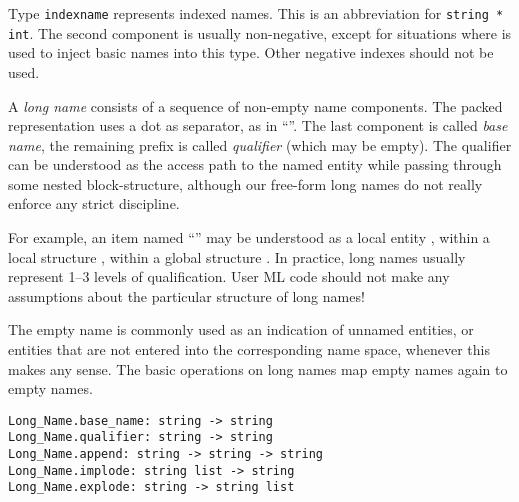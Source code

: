 \begin{isabellebody}
\begin{isamarkuptext}
\begin{description}
  \item Type \verb|indexname| represents indexed names.  This is
  an abbreviation for \verb|string * int|.  The second component
  is usually non-negative, except for situations where  is used to inject basic names into this type.  Other negative
  indexes should not be used.

  \end{description}%
\end{isamarkuptext}%
\isamarkuptrue%
%
\endisatagmlref
{\isafoldmlref}%
%
\isadelimmlref
%
\endisadelimmlref
%
\isamarkuptrue%
%
\begin{isamarkuptext}%
A \emph{long name} consists of a sequence of non-empty name
  components.  The packed representation uses a dot as separator, as
  in ``''.  The last component is called \emph{base
  name}, the remaining prefix is called \emph{qualifier} (which may be
  empty).  The qualifier can be understood as the access path to the
  named entity while passing through some nested block-structure,
  although our free-form long names do not really enforce any strict
  discipline.

  For example, an item named ``'' may be understood as
  a local entity , within a local structure ,
  within a global structure .  In practice, long names
  usually represent 1--3 levels of qualification.  User ML code should
  not make any assumptions about the particular structure of long
  names!

  The empty name is commonly used as an indication of unnamed
  entities, or entities that are not entered into the corresponding
  name space, whenever this makes any sense.  The basic operations on
  long names map empty names again to empty names.%
\end{isamarkuptext}%
\isamarkuptrue%
%
\isadelimmlref
%
\endisadelimmlref
%
\isatagmlref
%
\begin{isamarkuptext}%
\begin{mldecls}
  \verb|Long_Name.base_name: string -> string| \\
  \verb|Long_Name.qualifier: string -> string| \\
  \verb|Long_Name.append: string -> string -> string| \\
  \verb|Long_Name.implode: string list -> string| \\
  \verb|Long_Name.explode: string -> string list| \\
  \end{mldecls}


\end{isamarkuptext}
\end{isabellebody}
